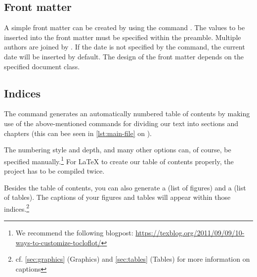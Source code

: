 \subsection{Front matter}
A simple front matter can be created by using the command . 
The values to be inserted into the front matter must be specified within the preamble. 
Multiple authors are joined by .
If the date is not specified by the  command, the current date will be inserted by default.
The design of the front matter depends on the specified document class.


\subsection{Indices}\label{sec:table-of-contents}

The command  generates an automatically numbered table of contents by making use of the above-mentioned commands for dividing our text into sections and chapters (this can bee seen in \cref{lst:main-file} on ).

The numbering style and depth, and many other options can, of course, be specified manually.\footnote{We recommend the following blogpost: \url{https://texblog.org/2011/09/09/10-ways-to-customize-tocloflot/}}
For \LaTeX{} to create our table of contents properly, the project has to be compiled twice.

Besides the table of contents, you can also generate a  (list of figures) and a  (list of tables). 
The captions of your figures and tables will appear within those indices.\footnote{cf. \cref{sec:graphics} (Graphics) and \cref{sec:tables} (Tables) for more information on captions}
